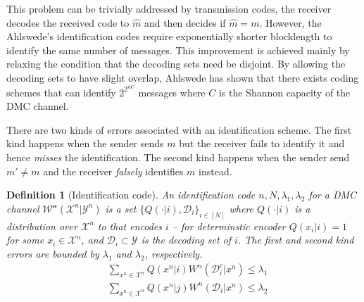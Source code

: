 \documentclass{article}
\newtheorem{definition}{Definition}
\begin{document}
This problem can be trivially addressed by transmission codes, the receiver decodes the received code to \(\hat{m}\) and then decides if \(\hat{m} = m\). However, the  Ahlswede's identification codes require exponentially shorter blocklength to identify the same number of messages. This improvement is achieved mainly by relaxing the condition that the decoding sets need be disjoint. By allowing the decoding sets to have slight overlap, Ahlswede \cite{idfeedback} has shown that there exists coding schemes that can identify \(2^{2^{nC}}\) messages where \(C\) is the Shannon capacity of the DMC channel.

There are two kinds of errors associated with an identification scheme. The first kind happens when the sender sends \(m\) but the receiver fails to identify it and hence \textit{misses} the identification. The second kind happens when the sender send \(m' \neq m\) and the receiver \textit{falsely} identifies \(m\) instead.

\begin{definition}[Identification code]
	An identification code \(n, N,\lambda_1, \lambda_2\) for a DMC channel \(\mathcal{W^n}(\mathcal{X}^n | \mathcal{Y}^n)\) is a set \(\{ Q( \cdot |i), \mathcal{D}_i \}_{i \in [N]}\) where \(Q(\cdot | i)\) is a distribution over \(\mathcal{X}^n\) to that encodes \(i\) -- for determinstic encoder \(Q(x_i | i) = 1\) for some \(x_i \in \mathcal{X}^n\), and \(\mathcal{D}_i \subset \mathcal{Y}\) is the decoding set of \(i\). The first and second kind errors are bounded by \(\lambda_1\) and \(\lambda_2\), respectively.
	\begin{align*}
		&\sum_{x^n \in \mathcal{X}^n} Q(x^n | i) W^n(\mathcal{D}_i^c | x^n) \leq \lambda_1 \\
		&\sum_{x^n \in \mathcal{X}^n} Q(x^n | j) W^n(\mathcal{D}_i | x^n) \leq \lambda_2 \\
	\end{align*}
\end{definition}
\end{document}
